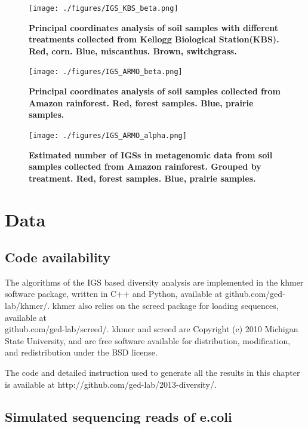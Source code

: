 \begin{figure}[!ht]
 \centerline{\texttt{[image: ./figures/IGS\_KBS\_beta.png]}}
\caption{\bf  Principal coordinates analysis of soil samples with different
treatments collected from Kellogg Biological Station(KBS). Red, corn. Blue,
miscanthus. Brown, switchgrass.}
\label{fig:KBS_beta}
\end{figure}

\begin{figure}[!ht]
 \centerline{\texttt{[image: ./figures/IGS\_ARMO\_beta.png]}}
\caption{\bf Principal coordinates analysis of soil samples collected from
Amazon rainforest. Red, forest samples. Blue, prairie
samples.}
\label{fig:ARMO_beta}
\end{figure}

\begin{figure}[!ht]
 \centerline{\texttt{[image: ./figures/IGS\_ARMO\_alpha.png]}}
\caption{\bf Estimated number of IGSs in metagenomic data from soil samples
collected from Amazon rainforest. Grouped by treatment. Red, forest samples. Blue, prairie
samples.}

\label{fig:ARMO_alpha}
\end{figure}


\section{Data}


\subsection{Code availability}
The algorithms of the IGS based diversity analysis are implemented 
 in the khmer software
package, written in C++ and Python, available at github.com/ged-lab/khmer/.
 khmer also relies on the screed package for loading
sequences, available at \\
github.com/ged-lab/screed/.
khmer and screed are Copyright (c) 2010 Michigan State University, and are free
software available for distribution, modification, and redistribution under the
BSD license.

The code and detailed instruction used to generate all the results in this 
chapter is available at
http://github.com/ged-lab/2013-diversity/. 


\subsection{Simulated sequencing reads of e.coli}





